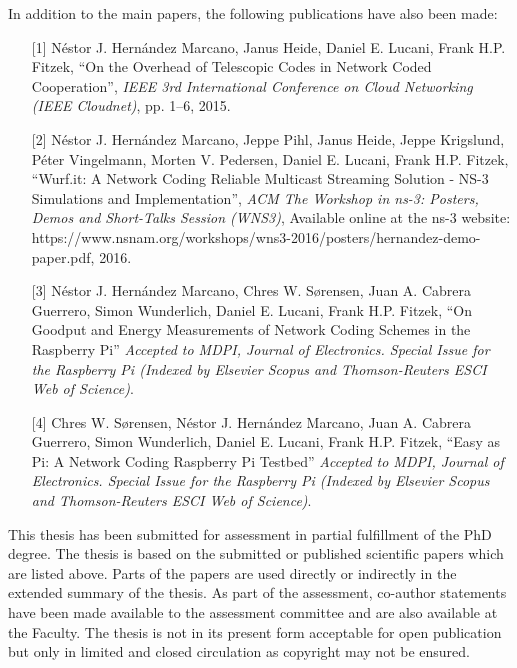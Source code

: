 \noindent In addition to the main papers, the following publications have also been made:
\begin{itemize}

  \item[{[1]}] N\'estor J. Hern\'andez Marcano, Janus Heide, Daniel E. Lucani, Frank H.P. Fitzek, ``On the Overhead of Telescopic Codes in Network Coded Cooperation'', \emph{IEEE 3rd International Conference on Cloud Networking (IEEE Cloudnet)}, pp. 1--6, 2015.

  \item[{[2]}] N\'estor J. Hern\'andez Marcano, Jeppe Pihl, Janus Heide, Jeppe Krigslund, P\'eter Vingelmann, Morten V. Pedersen, Daniel E. Lucani, Frank H.P. Fitzek, ``Wurf.it: A Network Coding Reliable Multicast Streaming Solution - NS-3 Simulations and Implementation'', \emph{ACM The Workshop in ns-3: Posters, Demos and Short-Talks Session (WNS3)}, Available online at the ns-3 website: https://www.nsnam.org/workshops/wns3-2016/posters/hernandez-demo-paper.pdf, 2016.

  \item[{[3]}] N\'estor J. Hern\'andez Marcano, Chres W. S\o rensen, Juan A. Cabrera Guerrero, Simon Wunderlich, Daniel E. Lucani, Frank H.P. Fitzek, ``On Goodput and Energy Measurements of Network Coding Schemes in the Raspberry Pi'' \emph{Accepted to MDPI, Journal of Electronics. Special Issue for the Raspberry Pi (Indexed by Elsevier Scopus and Thomson-Reuters ESCI Web of Science)}.

  \item[{[4]}] Chres W. S\o rensen, N\'estor J. Hern\'andez Marcano, Juan A. Cabrera Guerrero, Simon Wunderlich, Daniel E. Lucani, Frank H.P. Fitzek, ``Easy as Pi: A Network Coding Raspberry Pi Testbed'' \emph{Accepted to MDPI, Journal of Electronics. Special Issue for the Raspberry Pi (Indexed by Elsevier Scopus and Thomson-Reuters ESCI Web of Science)}.

\end{itemize}

\noindent This thesis has been submitted for assessment in partial fulfillment of the PhD degree. The thesis is based on the submitted or published scientific papers which are listed above. Parts of the papers are used directly or indirectly in the extended summary of the thesis. As part of the assessment, co-author statements have been made available to the assessment committee and are also available at the Faculty. The thesis is not in its present form acceptable for open publication but only in limited and closed circulation as copyright may not be ensured.